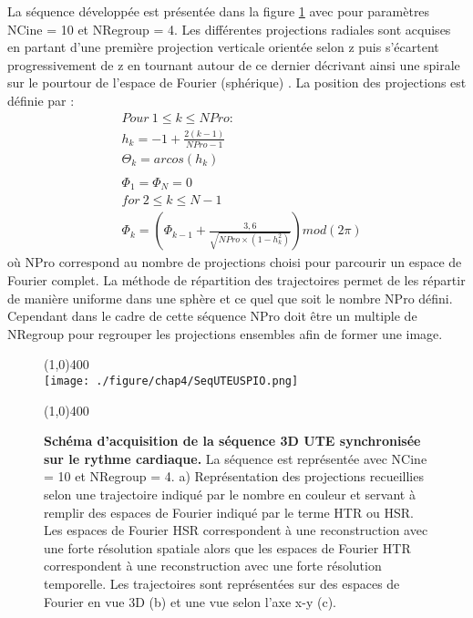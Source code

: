 La séquence développée est présentée dans la figure \ref{fig:SeqUTEUSPIO} avec pour paramètres NCine = 10 et NRegroup = 4. Les différentes projections radiales sont acquises en partant d'une première projection verticale orientée selon z puis s'écartent progressivement de z en tournant autour de ce dernier décrivant ainsi une spirale sur le pourtour de l'espace de Fourier (sphérique) \cite{Saff1997}.
 La position des projections est définie par :
\begin{equation}
\begin{split}
	& Pour \ 1 \leq k \leq NPro : \\ 
	& h_k = -1+\frac{2(k-1)}{NPro-1} \\
	& \Theta_k = arcos(h_k) \\
	& \\
	& \Phi_1=\Phi_N=0 \\	
	& for \ 2 \leq k \leq N-1 \\
	& \Phi_k=\left( \Phi_{k-1}+\frac{3,6}{\sqrt{NPro\times (1-h_k^2)}} \right)mod(2 \pi)	
\end{split}
\end{equation}
où NPro correspond au nombre de projections choisi pour parcourir un espace de Fourier complet. La méthode de répartition des trajectoires permet de les répartir de manière uniforme dans une sphère et ce quel que soit le nombre NPro défini. Cependant dans le cadre de cette séquence NPro doit être un multiple de NRegroup pour regrouper les projections ensembles afin de former une image.

\begin{figure}[H]
\centering
\line(1,0){400} \\
\texttt{[image: ./figure/chap4/SeqUTEUSPIO.png]}
\caption[Schéma d'acquisition de la séquence 3D UTE synchronisée sur le rythme cardiaque.]{\label{fig:SeqUTEUSPIO} \textbf{Schéma d'acquisition de la séquence 3D UTE synchronisée sur le rythme cardiaque.} La séquence est représentée avec NCine = 10 et NRegroup = 4. a) Représentation des projections recueillies selon une trajectoire indiqué par le nombre en couleur et servant à remplir des espaces de Fourier indiqué par le terme HTR ou HSR. Les espaces de Fourier HSR correspondent à une reconstruction avec une forte résolution spatiale alors que les espaces de Fourier HTR correspondent à une reconstruction avec une forte résolution temporelle. Les trajectoires sont représentées sur des espaces de Fourier en vue 3D (b) et une vue selon l'axe x-y (c).}
\line(1,0){400} \\ 
\end{figure}

